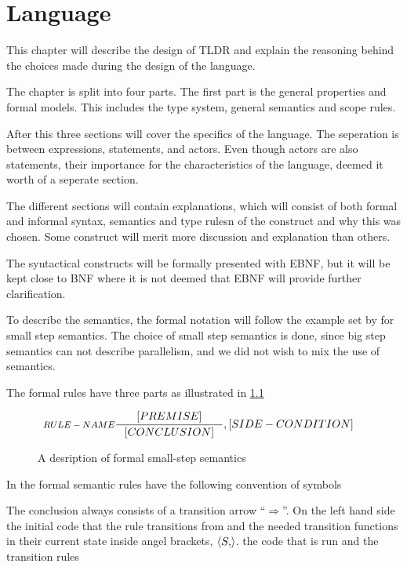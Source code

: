 \chapter{Language}\label{part:design}

This chapter will describe the design of TLDR and explain the reasoning behind the choices made during the design of the language.

The chapter is split into four parts. The first part is the general properties and formal models. This includes the type system, general semantics and scope rules.

After this three sections will cover the specifics of the language. The seperation is between expressions, statements, and actors. Even though actors are also statements, their importance for the characteristics of the language, deemed it worth of a seperate section.

The different sections will contain explanations, which will consist of both formal and informal syntax, semantics and type rulesn of the construct and why this was chosen. Some construct will merit more discussion and explanation than others.

The syntactical constructs will be formally presented with EBNF, but it will be kept close to BNF where it is not deemed that EBNF will provide further clarification. 

To describe the semantics, the formal notation will follow the example set by \cite{huttel2010transitions} for small step semantics. The choice of small step semantics is done, since big step semantics can not describe parallelism, and we did not wish to mix the use of semantics.

The formal rules have three parts as illustrated in \cref{SS-semantics}

\begin{figure}[H]
\begin{align*}
&\inference[$RULE-NAME$]{[PREMISE]}
                        {[CONCLUSION]}
                        {,[SIDE-CONDITION]}
\end{align*}
\caption{A desription of formal small-step semantics}
\label{SS-semantics}
\end{figure}

In the formal semantic rules have the following convention of symbols

The conclusion always consists of a transition arrow \enquote{$\Rightarrow$}. On the left hand side the initial code that the rule transitions from and the needed transition functions in their current state inside angel brackets, $\Braket{S,}$. the code that is run and the transition rules







